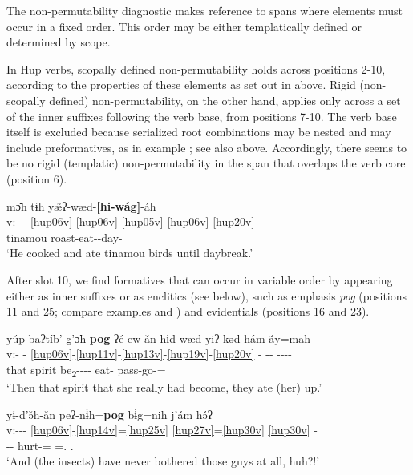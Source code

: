 \documentclass[output=paper]{langscibook}
\begin{document}
The non-permutability diagnostic makes reference to spans where elements must occur in a fixed order. This order may be either templatically defined or determined by scope. 

In Hup verbs, scopally defined non-permutability holds across positions 2-10, according to the properties of these elements as set out in  above. Rigid (non-scopally defined) non-permutability, on the other hand, applies only across a set of the inner suffixes following the verb base, from positions 7-10. The verb base itself is excluded because serialized root combinations may be nested and may include preformatives, as in example ; see also  above. Accordingly, there seems to be no rigid (templatic) non-permutability in the span that overlaps the verb core (position 6).

\ea\label{ex:hup:key:17}
\glll mɔ̌h tɨh yæ̃ʔ-wæd-\textbf{[hi-wág]}-áh\\ 
v:- - \ref{hup06v}-\ref{hup06v}-\ref{hup05v}-\ref{hup06v}-\ref{hup20v}\\ 
tinamou \Third\Sg{} roast-eat-\Fact{}-day-\Decl{}\\ 
\glt `He cooked and ate tinamou birds until daybreak.'
\z 

After slot 10, we find formatives that can occur in variable order by appearing either as inner suffixes or as enclitics (see  below), such as emphasis \textit{pog} (positions 11 and 25; compare examples  and ) and evidentials (positions 16 and 23).

\ea\label{ex:hup:key:18}
\glll yúp baʔtɨ̌b' g'ɔ̃h-\textbf{pog}-ʔé-ew-ǎn hɨd wæd-yiʔ kǝd-hám-ã́y=mah\\ 
v:- - \ref{hup06v}-\ref{hup11v}-\ref{hup13v}-\ref{hup19v}-\ref{hup20v} - -{}- -{}-{}-{}-\\ 
that spirit be\textsubscript{2}-\Emph-\Pfv-\Flr-\Obj{} \Third\Pl{} eat-\Tel{} pass-go-\Dynm=\Rep{}\\
\glt `Then that spirit that she really had become, they ate (her) up.'
\z 

\ea\label{ex:hup:key:19}
\glll yɨ-d'ǝ̌h-ǎn peʔ-nɨ́h=\textbf{pog} bɨ́g=nih j'ám hǝ́ʔ\\ 
v:-{}-{}- \ref{hup06v}-\ref{hup14v}=\ref{hup25v} \ref{hup27v}=\ref{hup30v} \ref{hup30v} -\\ 
\Dem-\Pl-\Obj{} hurt-\Neg=\Emph{} \Hab=\Emph.\Co{} \Dst.\Cntr{} \Tag{}\\ 
\glt `And (the insects) have never bothered those guys at all, huh?!'
\z 
\end{document}
